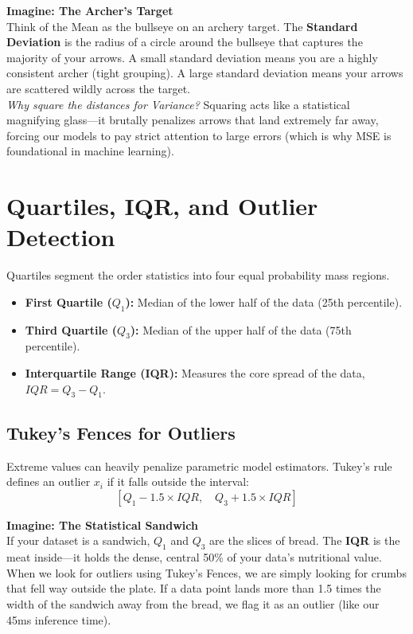 \documentclass[12pt]{article}
\begin{document}
\vspace{0.5em}
\noindent\textbf{Imagine: The Archer's Target}\\
Think of the Mean as the bullseye on an archery target. The \textbf{Standard Deviation} is the radius of a circle around the bullseye that captures the majority of your arrows. A small standard deviation means you are a highly consistent archer (tight grouping). A large standard deviation means your arrows are scattered wildly across the target. \\
\textit{Why square the distances for Variance?} Squaring acts like a statistical magnifying glass—it brutally penalizes arrows that land extremely far away, forcing our models to pay strict attention to large errors (which is why MSE is foundational in machine learning).


\section*{Quartiles, IQR, and Outlier Detection}
Quartiles segment the order statistics into four equal probability mass regions.

\begin{itemize}[leftmargin=*]
    \item \textbf{First Quartile ($Q_1$):} Median of the lower half of the data (25th percentile). 
    \item \textbf{Third Quartile ($Q_3$):} Median of the upper half of the data (75th percentile).
    \item \textbf{Interquartile Range (IQR):} Measures the core spread of the data, $IQR = Q_3 - Q_1$.
\end{itemize}

\subsection*{Tukey's Fences for Outliers}
Extreme values can heavily penalize parametric model estimators. Tukey's rule defines an outlier $x_i$ if it falls outside the interval:
\[ \left[ Q_1 - 1.5 \times IQR, \quad Q_3 + 1.5 \times IQR \right] \]

\vspace{0.5em}
\noindent\textbf{Imagine: The Statistical Sandwich}\\
If your dataset is a sandwich, $Q_1$ and $Q_3$ are the slices of bread. The \textbf{IQR} is the meat inside—it holds the dense, central 50\% of your data's nutritional value. When we look for outliers using Tukey's Fences, we are simply looking for crumbs that fell way outside the plate. If a data point lands more than 1.5 times the width of the sandwich away from the bread, we flag it as an outlier (like our 45ms inference time).
\end{document}
